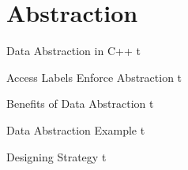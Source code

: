 \documentclass[../lecture5-objectorientation.tex]{subfiles}
\begin{document}
\section{Abstraction}


\begin{frame}[fragile]{Data Abstraction in C++}
t
\end{frame}


\begin{frame}[fragile]{Access Labels Enforce Abstraction}
t
\end{frame}


\begin{frame}[fragile]{Benefits of Data Abstraction}
t
\end{frame}


\begin{frame}[fragile]{Data Abstraction Example}
t
\end{frame}


\begin{frame}[fragile]{Designing Strategy}
t
\end{frame}

\end{document}
